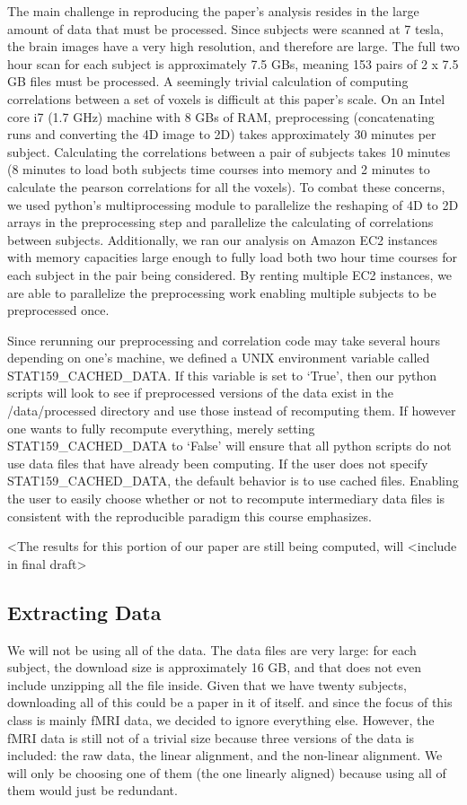 \documentclass[11pt]{article}
\begin{document}
The main challenge in reproducing the paper’s analysis resides in the large
amount of data that must be processed. Since subjects were scanned at 7 tesla,
the brain images have a very high resolution, and therefore are large. The
full two hour scan for each subject is approximately 7.5 GBs, meaning 153
pairs of 2 x 7.5 GB files must be processed. A seemingly trivial calculation
of computing correlations between a set of voxels is difficult at this paper’s
scale. On an Intel core i7 (1.7 GHz) machine with 8 GBs of RAM, preprocessing
(concatenating runs and converting the 4D image to 2D) takes approximately 30
minutes per subject. Calculating the correlations between a pair of subjects
takes 10 minutes (8 minutes to load both subjects time courses into memory and
2 minutes to calculate the pearson correlations for all the voxels).  To
combat these concerns, we used python’s multiprocessing module to parallelize
the reshaping of 4D to 2D arrays in the preprocessing step and parallelize the
calculating of correlations between subjects. Additionally, we ran our
analysis on Amazon EC2 instances with memory capacities large enough to fully
load both two hour time courses for each subject in the pair being considered.
By renting multiple EC2 instances, we are able to parallelize the
preprocessing work enabling multiple subjects to be preprocessed once.

Since rerunning our preprocessing and correlation code may take several hours
depending on one’s machine, we defined a UNIX environment variable called
STAT159\_CACHED\_DATA. If this variable is set to ‘True’, then our python
scripts will look to see if preprocessed versions of the data exist in the
/data/processed directory and use those instead of recomputing them. If
however one wants to fully recompute everything, merely setting
STAT159\_CACHED\_DATA to ‘False’ will ensure that all python scripts do not
use data files that have already been computing. If the user does not specify
STAT159\_CACHED\_DATA, the default behavior is to use cached files. Enabling
the user to easily choose whether or not to recompute intermediary data files
is consistent with the reproducible paradigm this course emphasizes.

<The results for this portion of our paper are still being computed, will
<include in final draft>

\subsection{Extracting Data} We will not be using all of the data. The data
files are very large: for each subject, the download size is approximately 16
GB, and that does not even include unzipping all the file inside. Given that
we have twenty subjects, downloading all of this could be a paper in it of
itself. and since the focus of this class is mainly fMRI data, we decided to
ignore everything else. However, the fMRI data is still not of a trivial size
because three versions of the data is included: the raw data, the linear
alignment, and the non-linear alignment. We will only be choosing one of them
(the one linearly aligned) because using all of them would just be redundant.
\end{document}
